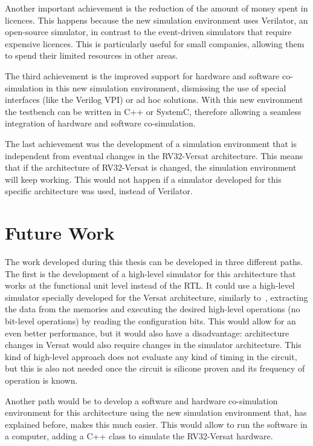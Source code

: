 Another important achievement is the reduction of the amount of money spent in licences. 
This happens because the new simulation environment uses Verilator, an open-source 
simulator, in contrast to the event-driven simulators that require expensive licences. 
This is particularly useful for small companies, allowing them to spend their limited 
resources in other areas.

The third achievement is the improved support for hardware and software 
co-simulation in this new simulation environment, dismissing the use of special 
interfaces (like the Verilog \ac{VPI}) or ad hoc solutions. With this new environment the 
testbench can be written in C++ or SystemC, therefore allowing a seamless integration of 
hardware and software co-simulation.

The last achievement was the development of a simulation environment that is independent 
from eventual changes in the RV32-Versat architecture. This means that if the 
architecture of RV32-Versat is changed, the simulation environment will keep working. 
This would not happen if a simulator developed for this specific architecture was used, 
instead of Verilator.

\section{Future Work}
\label{section:future}

The work developed during this thesis can be developed in three different paths. The 
first is the development of a high-level simulator for this architecture that works at 
the functional unit level instead of the RTL. It could use a high-level simulator 
specially developed for the Versat architecture, similarly to~\cite{chen:CGRA}, extracting
the data from the memories and executing the desired high-level operations (no bit-level 
operations) by reading the configuration bits. This would allow for an even better 
performance, but it would also have a disadvantage: architecture changes in Versat would 
also require changes in the simulator architecture. This kind of high-level approach does 
not evaluate any kind of timing in the circuit, but this is also not needed once the 
circuit is silicone proven and its frequency of operation is known.

Another path would be to develop a software and hardware co-simulation environment for 
this architecture using the new simulation environment that, has explained before, makes 
this much easier. This would allow to run the software in a computer, adding a C++ class 
to simulate the RV32-Versat hardware.


